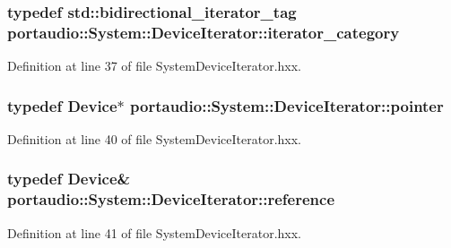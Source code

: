 \subsubsection[{\texorpdfstring{iterator\+\_\+category}{iterator_category}}]{\setlength{\rightskip}{0pt plus 5cm}typedef std\+::bidirectional\+\_\+iterator\+\_\+tag {\bf portaudio\+::\+System\+::\+Device\+Iterator\+::iterator\+\_\+category}}\hypertarget{classportaudio_1_1_system_1_1_device_iterator_a937d4b9bc319a53285b5f67fb784aeb3}{}\label{classportaudio_1_1_system_1_1_device_iterator_a937d4b9bc319a53285b5f67fb784aeb3}


Definition at line 37 of file System\+Device\+Iterator.\+hxx.

\subsubsection[{\texorpdfstring{pointer}{pointer}}]{\setlength{\rightskip}{0pt plus 5cm}typedef {\bf Device}$\ast$ {\bf portaudio\+::\+System\+::\+Device\+Iterator\+::pointer}}\hypertarget{classportaudio_1_1_system_1_1_device_iterator_aacd426e630b8d6526f7a0570dfafa8ee}{}\label{classportaudio_1_1_system_1_1_device_iterator_aacd426e630b8d6526f7a0570dfafa8ee}


Definition at line 40 of file System\+Device\+Iterator.\+hxx.

\subsubsection[{\texorpdfstring{reference}{reference}}]{\setlength{\rightskip}{0pt plus 5cm}typedef {\bf Device}\& {\bf portaudio\+::\+System\+::\+Device\+Iterator\+::reference}}\hypertarget{classportaudio_1_1_system_1_1_device_iterator_a828c6489c4aaecc29cee8d861aee349f}{}\label{classportaudio_1_1_system_1_1_device_iterator_a828c6489c4aaecc29cee8d861aee349f}


Definition at line 41 of file System\+Device\+Iterator.\+hxx.

